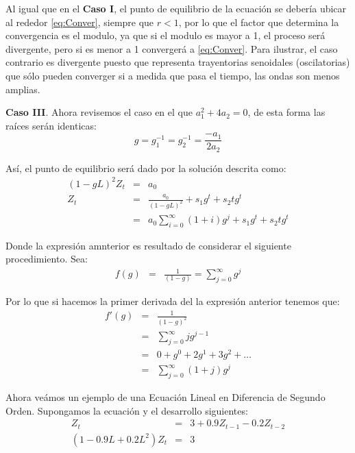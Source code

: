 \documentclass[
]{book}
\begin{document}
Al igual que en el \textbf{Caso I}, el punto de equilibrio de la ecuación se debería ubicar al rededor \eqref{eq:Conver}, siempre que \(r < 1\), por lo que el factor que determina la convergencia es el modulo, ya que si el modulo es mayor a 1, el proceso será divergente, pero si es menor a 1 convergerá a \eqref{eq:Conver}. Para ilustrar, el caso contrario es divergente puesto que representa trayentorias senoidales (oscilatorias) que sólo pueden converger si a medida que pasa el tiempo, las ondas son menos amplias.

\textbf{Caso III}. Ahora revisemos el caso en el que \(a_1^2 + 4a_2 = 0\), de esta forma las raíces serán identicas:
\begin{equation}
    g = g_1^{-1} = g_2^{-1} = \frac{-a_1}{2 a_2}
    \label{eq:Conver6}
\end{equation}

Así, el punto de equilibrio será dado por la solución descrita como:
\begin{eqnarray}
    (1 - g L)^2 Z_t & = & a_0 \nonumber \\
    Z_t & = & \frac{a_0}{(1 - g L)^2} + s_1 g^t + s_2 t g^t \nonumber \\
    & = & a_0 \sum_{i = 0}^{\infty} (1 + i) g^j + s_1 g^t + s_2 t g^t
    \label{eq:Conver7}
\end{eqnarray}

Donde la expresión amnterior es resultado de considerar el siguiente procedimiento. Sea:
\begin{eqnarray}
    f(g) & = & \frac{1}{(1 - g)} = \sum_{j = 0}^{\infty} g^j \nonumber
\end{eqnarray}

Por lo que si hacemos la primer derivada del la expresión anterior tenemos que:
\begin{eqnarray}
    f'(g) & = & \frac{1}{(1 - g)^2} \nonumber \\
    & = & \sum_{j = 0}^{\infty} j g^{j-1} \nonumber \\
    & = & 0 + g^0 + 2 g^1 + 3 g^2 + \ldots \nonumber \\
    & = & \sum_{j = 0}^{\infty} (1 + j) g^j \nonumber
\end{eqnarray}

Ahora veámos un ejemplo de una Ecuación Lineal en Diferencia de Segundo Orden. Supongamos la ecuación y el desarrollo siguientes:
\begin{eqnarray}
    Z_t & = & 3 + 0.9 Z_{t-1} - 0.2 Z_{t-2} \nonumber \\
    (1 - 0.9 L + 0.2 L^2) Z_t & = & 3 \nonumber
\end{eqnarray}
\end{document}
